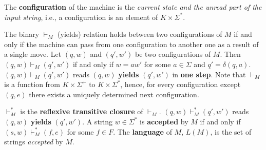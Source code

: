 The \textbf{configuration} of the machine is the \textit{current state and the unread part of the input string}, i.e., a configuration is an element of $K \times \Sigma^*$.

The binary $\vdash_M$ (yields) relation holds between two configurations of $M$ if and only if the machine can pass from one configuration to another one as a result of a single move. Let $(q, w)$ and $(q',w')$ be two configurations of $M$. Then $(q, w) \vdash_M (q', w')$ if and only if $w = aw'$ for some $a \in \Sigma$ and $q' = \delta(q, a)$. $(q, w) \vdash_M (q', w')$ reads $(q, w)$ \textbf{yields} $(q', w')$ in \textbf{one step}. Note that $\vdash_M$ is a function from $K \times \Sigma^+$ to $K \times \Sigma^*$, hence, for every configuration except $(q, e)$ there exists a uniquely determined next configuration.

$\vdash^*_M$ is the \textbf{reflexive transitive closure} of $\vdash_M$. $(q, w) \vdash^*_M (q', w')$ reads $(q, w)$ \textbf{yields} $(q', w')$. A string $w \in \Sigma^*$ is \textbf{accepted} by $M$ if and only if $(s, w) \vdash^*_M (f, e)$ for some $f \in F$. The \textbf{language} of $M$, $L(M)$, is the set of strings \textit{accepted} by $M$.

